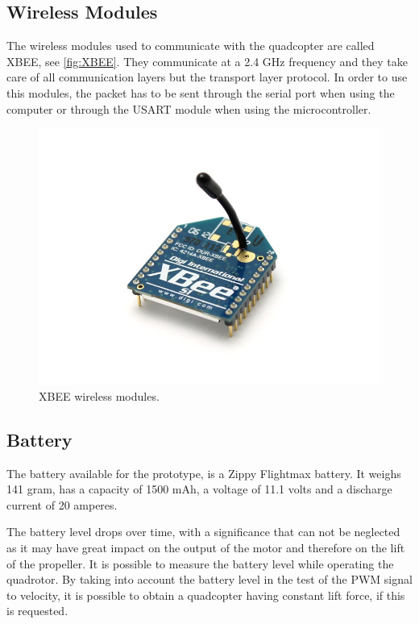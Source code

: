 \subsection{Wireless Modules}
The wireless modules used to communicate with the quadcopter are called XBEE, see \autoref{fig:XBEE}. They communicate at a 2.4 GHz frequency and they take care of all communication layers but the transport layer protocol. In order to use this modules, the packet has to be sent through the serial port when using the computer or through the USART module when using the microcontroller. 
\begin{figure}[H]
	\centering
	\includegraphics[scale=0.4]{figures/XBEE}
	\caption{XBEE wireless modules.}
	\label{fig:XBEE}
\end{figure}

\subsection{Battery}
The battery available for the prototype, is a Zippy Flightmax battery. It weighs 141 gram, has a capacity of 1500 mAh, a voltage of 11.1 volts and a discharge current of 20 amperes.

The battery level drops over time, with a significance that can not be neglected as it may have great impact on the output of the motor and therefore on the lift of the propeller. It is possible to measure the battery level while operating the quadrotor. By taking into account the battery level in the test of the PWM signal to velocity, it is possible to obtain a quadcopter having constant lift force, if this is requested.

